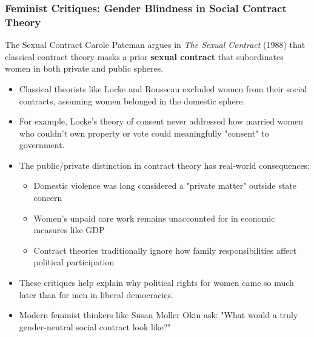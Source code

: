 \documentclass[aspectratio=169]{beamer}
\begin{document}
\begin{frame}
  \frametitle{Feminist Critiques: Gender Blindness in Social Contract Theory}
  
  \begin{block}{The Sexual Contract}
    Carole Pateman argues in \textit{The Sexual Contract} (1988) that classical contract theory masks a prior \textbf{sexual contract} that subordinates women in both private and public spheres.
  \end{block}
  
  \begin{itemize}
    \item Classical theorists like Locke and Rousseau excluded women from their social contracts, assuming women belonged in the domestic sphere.
    \item For example, Locke's theory of consent never addressed how married women who couldn't own property or vote could meaningfully "consent" to government.
    \item The public/private distinction in contract theory has real-world consequences:
      \begin{itemize}
        \item Domestic violence was long considered a "private matter" outside state concern
        \item Women's unpaid care work remains unaccounted for in economic measures like GDP
        \item Contract theories traditionally ignore how family responsibilities affect political participation
      \end{itemize}
    \item These critiques help explain why political rights for women came so much later than for men in liberal democracies.
    \item Modern feminist thinkers like Susan Moller Okin ask: "What would a truly gender-neutral social contract look like?"
  \end{itemize}
\end{frame}
\end{document}
